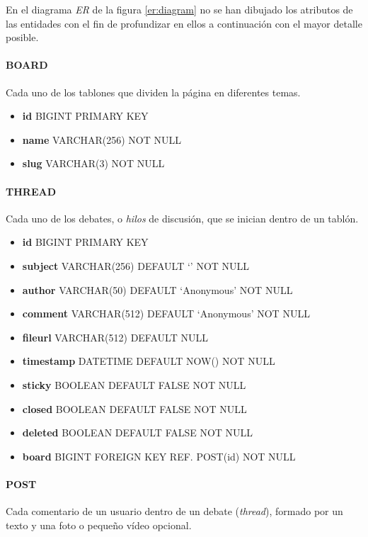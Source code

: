\documentclass[12pt,a4paper,titlepage]{article}
\begin{document}
    En el diagrama \emph{ER} de la figura \ref{er:diagram} no se han dibujado los atributos de las entidades con el fin de profundizar en ellos a continuación con el mayor detalle posible.

    \paragraph{BOARD} Cada uno de los tablones que dividen la página en diferentes temas.

    \begin{itemize}
        \item \textbf{id} BIGINT PRIMARY KEY
        \item \textbf{name} VARCHAR(256) NOT NULL
        \item \textbf{slug} VARCHAR(3) NOT NULL
    \end{itemize}

    \paragraph{THREAD} Cada uno de los debates, o \emph{hilos} de discusión, que se inician dentro de un tablón.

    \begin{itemize}
        \item \textbf{id} BIGINT PRIMARY KEY
        \item \textbf{subject} VARCHAR(256) DEFAULT `' NOT NULL
        \item \textbf{author} VARCHAR(50) DEFAULT `Anonymous' NOT NULL
        \item \textbf{comment} VARCHAR(512) DEFAULT `Anonymous' NOT NULL
        \item \textbf{fileurl} VARCHAR(512) DEFAULT NULL
        \item \textbf{timestamp} DATETIME DEFAULT NOW() NOT NULL
        \item \textbf{sticky} BOOLEAN DEFAULT FALSE NOT NULL
        \item \textbf{closed} BOOLEAN DEFAULT FALSE NOT NULL
        \item \textbf{deleted} BOOLEAN DEFAULT FALSE NOT NULL
        \item \textbf{board} BIGINT FOREIGN KEY REF. POST(id) NOT NULL
    \end{itemize}

    \paragraph{POST} Cada comentario de un usuario dentro de un debate (\textit{thread}), formado por un texto y una foto o pequeño vídeo opcional.
\end{document}
